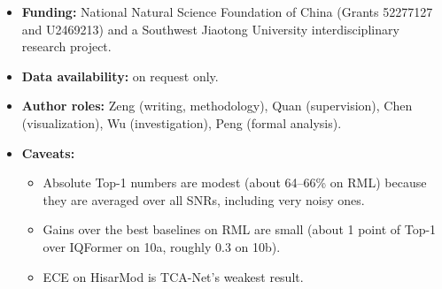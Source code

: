 \documentclass[11pt,a4paper]{article}
\begin{document}
\begin{itemize}
  \item \textbf{Funding:} National Natural Science Foundation of China (Grants 52277127 and U2469213) and a Southwest Jiaotong University interdisciplinary research project.
  \item \textbf{Data availability:} on request only.
  \item \textbf{Author roles:} Zeng (writing, methodology), Quan (supervision), Chen (visualization), Wu (investigation), Peng (formal analysis).
  \item \textbf{Caveats:}
  \begin{itemize}
    \item Absolute Top-1 numbers are modest (about 64--66\% on RML) because they are averaged over all SNRs, including very noisy ones.
    \item Gains over the best baselines on RML are small (about 1 point of Top-1 over IQFormer on 10a, roughly 0.3 on 10b).
    \item ECE on HisarMod is TCA-Net's weakest result.
  \end{itemize}
\end{itemize}
\end{document}
